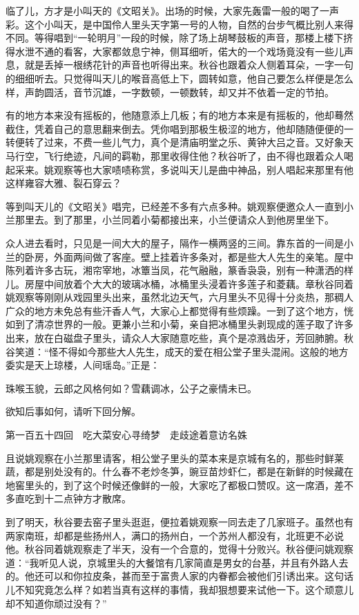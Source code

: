 \documentclass[12pt,UTF8]{ctexbook}
\begin{document}
{{{临了儿，方才是小叫天的《文昭关》。出场的时候，大家先轰雷一般的喝了一声彩。这个小叫天，是中国伶人里头天字第一号的人物，自然的台步气概比别人来得不同。等得唱到“一轮明月”一段的时候，除了场上胡琴鼓板的声音，那楼上楼下挤得水泄不通的看客，大家都敛息宁神，侧耳细听，偌大的一个戏场竟没有一些儿声息，就是丢掉一根绣花针的声音也听得出来。秋谷也跟着众人侧着耳朵，一字一句的细细听去。只觉得叫天儿的喉音高低上下，圆转如意，他自己要怎么样便是怎么样，声韵圆活，音节沉雄，一字数顿，一顿数转，却又并不依着一定的节拍。

有的地方本来没有摇板的，他随意添上几板；有的地方本来是有摇板的，他却蓦然截住，凭着自己的意思翻来倒去。凭你唱到那极生极涩的地方，他却随随便便的一转便转了过来，不费一些儿气力，真个是清庙明堂之乐、黄钟大吕之音。又好象天马行空，飞行绝迹，凡间的羁勒，那里收得住他？秋谷听了，由不得也跟着众人喝起采来。姚观察等也大家啧啧称赏，多说叫天儿是曲中神品，别人唱起来那里有他这样雍容大雅、裂石穿云？

等到叫天儿的《文昭关》唱完，已经差不多有六点多种。姚观察便邀众人一直到小兰那里去。到了那里，小兰同着小菊都接出来，小兰便请众人到他房里坐下。

众人进去看时，只见是一间大大的屋子，隔作一横两竖的三间。靠东首的一间是小兰的卧房，外面两间做了客座。壁上挂着许多条对，都是些大人先生的亲笔。屋中陈列着许多古玩，湘帘宰地，冰簟当凤，花气融融，篆香袅袅，别有一种潇洒的样儿。房屋中间放着个大大的玻璃冰桶，冰桶里头浸着许多莲子和菱藕。章秋谷同着姚观察等刚刚从戏园里头出来，虽然北边天气，六月里头不见得十分炎热，那稠人广众的地方未免总有些汗香人气，大家心上都觉得有些烦躁。一到了这个地方，恍如到了清凉世界的一般。更兼小兰和小菊，亲自把冰桶里头剥现成的莲子取了许多出来，放在白磁盘子里头，请众人大家随意吃些，真个是凉溅齿牙，芳回肺腑。秋谷笑道：“怪不得如今那些大人先生，成天的爱在相公堂子里头混闹。这般的地方委实是天上琼楼，人间瑶岛。”正是：

珠喉玉貌，云郎之风格何如？雪藕调冰，公子之豪情未已。

欲知后事如何，请听下回分解。





第一百五十四回　吃大菜安心寻绮梦　走歧途着意访名姝





且说姚观察在小兰那里请客，相公堂子里头的菜本来是京城有名的，那些时鲜莱蔬，都是别处没有的。什么春不老炒冬笋，豌豆苗炒虾仁，都是在新鲜的时候藏在地窖里头的，到了这个时候还像鲜的一般，大家吃了都极口赞叹。这一席酒，差不多直吃到十二点钟方才散席。

到了明天，秋谷要去窑子里头逛逛，便拉着姚观察一同去走了几家班子。虽然也有两家南班，却都是些扬州人，满口的扬州白，一个苏州人都没有，北班更不必说他。秋谷同着姚观察走了半天，没有一个合意的，觉得十分败兴。秋谷便问姚观察道：“我听见人说，京城里头的大餐馆有几家简直是男女的台基，并且有外路人去的。他还可以和你拉皮条，甚而至于富贵人家的内眷都会被他们引诱出来。这句话儿不知究竟怎么样？如若当真有这样的事情，我却狠想要来试他一下。这个顽意儿却不知道你顽过没有？”

}}}
\end{document}
